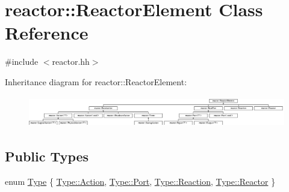 \hypertarget{classreactor_1_1ReactorElement}{}\section{reactor\+:\+:Reactor\+Element Class Reference}
\label{classreactor_1_1ReactorElement}


{\ttfamily \#include $<$reactor.\+hh$>$}

Inheritance diagram for reactor\+:\+:Reactor\+Element\+:\begin{figure}[H]
\begin{center}
\leavevmode
\includegraphics[height=1.367521cm]{classreactor_1_1ReactorElement}
\end{center}
\end{figure}
\subsection*{Public Types}
\begin{DoxyCompactItemize}
\item 
enum \hyperlink{classreactor_1_1ReactorElement_a9291659e2893372cfea42ffccfd487b2}{Type} \{ \hyperlink{classreactor_1_1ReactorElement_a9291659e2893372cfea42ffccfd487b2a004bf6c9a40003140292e97330236c53}{Type\+::\+Action}, 
\hyperlink{classreactor_1_1ReactorElement_a9291659e2893372cfea42ffccfd487b2a60aaf44d4b562252c04db7f98497e9aa}{Type\+::\+Port}, 
\hyperlink{classreactor_1_1ReactorElement_a9291659e2893372cfea42ffccfd487b2aa87198fb6a6b4fe0b70c03fc2a43a8f4}{Type\+::\+Reaction}, 
\hyperlink{classreactor_1_1ReactorElement_a9291659e2893372cfea42ffccfd487b2a1436185f7342e0210be86e7e17963250}{Type\+::\+Reactor}
 \}
\end{DoxyCompactItemize}
